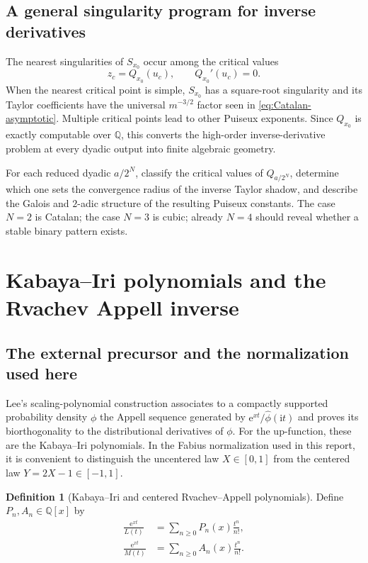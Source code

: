 \documentclass[11pt,oneside]{article}
\theoremstyle{frontier}
\theoremstyle{definition}
\newtheorem{definition}[theorem]{Definition}
\theoremstyle{remark}
\newcommand{\Q}{\mathbb Q}
\newcommand{\e}{\mathrm e}
\newcommand{\ii}{\mathrm i}
\begin{document}
\subsection{A general singularity program for inverse derivatives}

The nearest singularities of $S_{x_0}$ occur among the critical values
\begin{equation}
 z_c=Q_{x_0}(u_c),
 \qquad Q_{x_0}'(u_c)=0.
 \label{eq:critical-values}
\end{equation}
When the nearest critical point is simple, $S_{x_0}$ has a square-root singularity and its Taylor
coefficients have the universal $m^{-3/2}$ factor seen in \eqref{eq:Catalan-asymptotic}.  Multiple
critical points lead to other Puiseux exponents.  Since $Q_{x_0}$ is exactly computable over $\Q$,
this converts the high-order inverse-derivative problem at every dyadic output into finite algebraic
geometry.

\begin{frontierbox}
For each reduced dyadic $a/2^N$, classify the critical values of $Q_{a/2^N}$, determine which one
sets the convergence radius of the inverse Taylor shadow, and describe the Galois and $2$-adic
structure of the resulting Puiseux constants.  The case $N=2$ is Catalan; the case $N=3$ is cubic;
already $N=4$ should reveal whether a stable binary pattern exists.
\end{frontierbox}

\section{Kabaya--Iri polynomials and the Rvachev Appell inverse}
\label{sec:appell}

\subsection{The external precursor and the normalization used here}

Lee's scaling-polynomial construction associates to a compactly supported probability density
$\phi$ the Appell sequence generated by $\e^{xt}/\widehat\phi(\ii t)$ and proves its biorthogonality
to the distributional derivatives of $\phi$.  For the up-function, these are the Kabaya--Iri
polynomials.  In the Fabius normalization used in this report, it is convenient to distinguish the
uncentered law $X\in[0,1]$ from the centered law $Y=2X-1\in[-1,1]$.

\begin{definition}[Kabaya--Iri and centered Rvachev--Appell polynomials]
\label{def:Appell-polys}
Define $P_n,A_n\in\Q[x]$ by
\begin{align}
 \frac{\e^{xt}}{L(t)}
 &=\sum_{n\ge0}P_n(x)\frac{t^n}{n!},
 \label{eq:P-generating}\\
 \frac{\e^{xt}}{M(t)}
 &=\sum_{n\ge0}A_n(x)\frac{t^n}{n!}.
 \label{eq:A-generating}
\end{align}
\end{definition}
\end{document}
